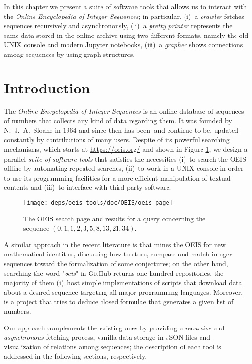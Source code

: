 
In this chapter we present a suite of software tools that allows us to interact
with the \textit{Online Encyclopedia of Integer Sequences}; in particular,
(i)~a \textit{crawler} fetches sequences recursively and asynchronously, (ii)~a
\textit{pretty printer} represents the same data stored in the online archive
using two different formats, namely the old UNIX console and modern Jupyter
notebooks, (iii)~a \textit{grapher} shows connections among sequences by using
graph structures.

\section{Introduction}

The \textit{Online Encyclopedia of Integer Sequences} \citep{OEIS} is an online
database of sequences of numbers that collects any kind of data regarding them.
It was founded by N.~J.~A.~Sloane in $1964$ and since then has been, and
continue to be, updated constantly by contributions of many users. Despite of
its powerful searching mechanisms, which starts at \url{https://oeis.org/} and
shown in Figure \ref{fig:oeis:page}, we design a parallel \textit{suite of
software tools} that satisfies the necessities (i)~to search the OEIS offline
by automating repeated searches, (ii)~to work in a UNIX console in order to use
its programming facilities for a more efficient manipulation of textual
contents and (iii)~to interface with third-party software.

\begin{figure}
\texttt{[image: deps/oeis-tools/doc/OEIS/oeis-page]}
\caption{The OEIS search page and results for a query concerning the sequence
$(0,1,1,2,3,5,8,13,21,34)$.}
\label{fig:oeis:page}
\end{figure}

A similar approach in the recent literature is \citep{Nguyen_miningthe} that
mines the OEIS for new mathematical identities, discussing how to store,
compare and match integer sequences toward the formalization of some
conjectures; on the other hand, searching the word "\textit{oeis}" in GitHub
returns one hundred repositories, the majority of them (i)~host simple
implementations of scripts that download data about a desired sequence
targeting all major programming languages. Moreover, \citep{weidmann:sequencer}
is a project that tries to deduce closed formulae that generates a given list
of numbers.

Our approach complements the existing ones by providing a \textit{recursive}
and \textit{asynchronous} fetching process, vanilla data storage in JSON files
and visualization of relations among sequences; the description of each tool is
addressed in the following sections, respectively.

